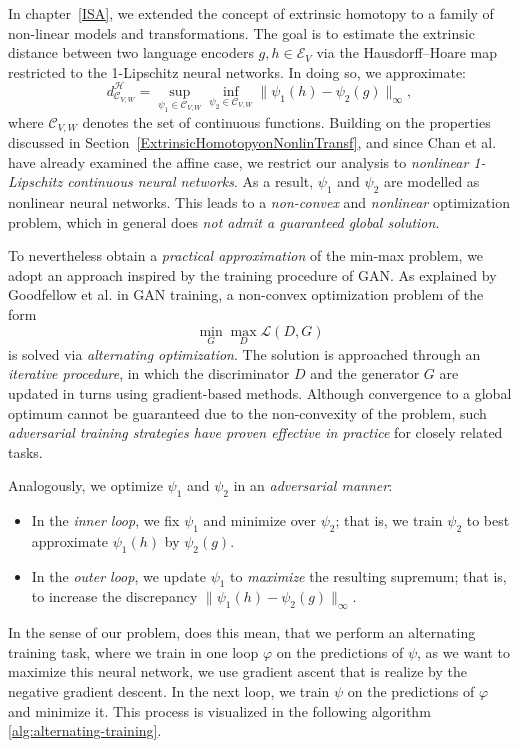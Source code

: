 In chapter~\ref{ISA}, we extended the concept of extrinsic homotopy to a family of non-linear models and transformations. 
The goal is to estimate the extrinsic distance between two language encoders $g,h\in \mathcal{E}_V$ via the Hausdorff–Hoare map restricted to the 1-Lipschitz neural networks.
In doing so, we approximate:
\[d^\mathcal{H}_{\mathcal{C}_{V,W}} = \sup\limits_{\psi_1 \in\mathcal{C}_{V,W}} \inf\limits_{\psi_2 \in \mathcal{C}_{V,W}}\|\psi_1(h) - \psi_2(g)\|_\infty,\] 
where $\mathcal{C}_{V,W}$ denotes the set of continuous functions.
Building on the properties discussed in Section~\ref{ExtrinsicHomotopyonNonlinTransf}, and since Chan et al.~\cite{chan_affine_2024} have already examined the affine case, we restrict our analysis to \emph{nonlinear 1-Lipschitz continuous neural networks}.  
As a result, $\psi_1$ and $\psi_2$ are modelled as nonlinear neural networks.  
This leads to a \emph{non-convex} and \emph{nonlinear} optimization problem, which in general does \emph{not admit a guaranteed global solution}.

To nevertheless obtain a \emph{practical approximation} of the min-max problem, we adopt an approach inspired by the training procedure of \ac{GAN}. 
As explained by Goodfellow et al. \cite{goodfellow_generative_2014} in \ac{GAN} training, a non-convex optimization problem of the form
\[
\min_G \max_D \mathcal{L}(D, G)
\]
is solved via \emph{alternating optimization}.
The solution is approached through an \emph{iterative procedure}, in which the discriminator $D$ and the generator $G$ are updated in turns using gradient-based methods.
Although convergence to a global optimum cannot be guaranteed due to the non-convexity of the problem, such \emph{adversarial training strategies have proven effective in practice} for closely related tasks.



Analogously, we optimize $\psi_1$ and $\psi_2$ in an \emph{adversarial manner}:
\begin{itemize}
    \item In the \emph{inner loop}, we fix $\psi_1$ and minimize over $\psi_2$; that is, we train $\psi_2$ to best approximate $\psi_1(h)$ by $\psi_2(g)$.
    \item In the \emph{outer loop}, we update $\psi_1$ to \emph{maximize} the resulting supremum; that is, to increase the discrepancy $\|\psi_1(h) - \psi_2(g)\|_\infty$.
\end{itemize}

In the sense of our problem, does this mean, that we perform an alternating training task, where we train in one loop $\varphi$ on the predictions of $\psi$, as we want to maximize this neural network, we use gradient ascent that is realize by the negative gradient descent.
In the next loop, we train $\psi$ on the predictions of $\varphi$ and minimize it.
This process is visualized in the following algorithm \ref{alg:alternating-training}.

